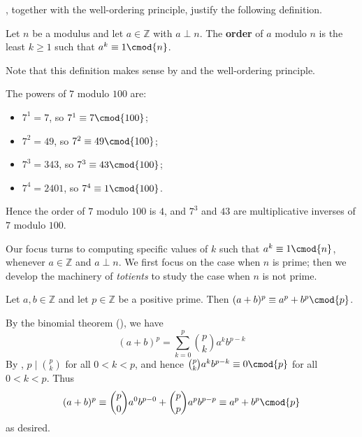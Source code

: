 , together with the well-ordering principle, justify the following definition.

\begin{definition}
\label{defOrderModularArithmetic}
Let $n$ be a modulus and let $a \in \mathbb{Z}$ with $a \perp n$. The \textbf{order} of $a$ modulo $n$ is the least $k \ge 1$ such that $a^k \equiv 1 \cmod{n}$.
\end{definition}

Note that this definition makes sense by  and the well-ordering principle.

\begin{example}
The powers of $7$ modulo $100$ are:
\begin{itemize}
\item $7^1 = 7$, so $7^1 \equiv 7 \cmod{100}$;
\item $7^2 = 49$, so $7^2 \equiv 49 \cmod{100}$;
\item $7^3 = 343$, so $7^3 \equiv 43 \cmod{100}$;
\item $7^4 = 2401$, so $7^4 \equiv 1 \cmod{100}$.
\end{itemize}
Hence the order of $7$ modulo $100$ is $4$, and $7^3$ and $43$ are multiplicative inverses of $7$ modulo $100$.
\end{example}

Our focus turns to computing specific values of $k$ such that $a^k \equiv 1 \cmod{n}$, whenever $a \in \mathbb{Z}$ and $a \perp n$. We first focus on the case when $n$ is prime; then we develop the machinery of \textit{totients} to study the case when $n$ is not prime.

\begin{lemma} \label{lemBinomPrimeExponent}
Let $a,b \in \mathbb{Z}$ and let $p \in \mathbb{Z}$ be a positive prime. Then $(a+b)^p \equiv a^p+b^p \cmod{p}$.
\end{lemma}
\begin{cproof}
By the binomial theorem (), we have
\[ (a+b)^p = \sum_{k=0}^p \binom{p}{k} a^kb^{p-k} \]
By , $p \mid \binom{p}{k}$ for all $0 < k < p$, and hence $\binom{p}{k} a^k b^{p-k} \equiv 0 \cmod{p}$ for all $0 < k < p$. Thus
\[ (a+b)^p \equiv \binom{p}{0}a^0b^{p-0} + \binom{p}{p}a^pb^{p-p} \equiv a^p+b^p \cmod{p} \]
as desired.
\end{cproof}

